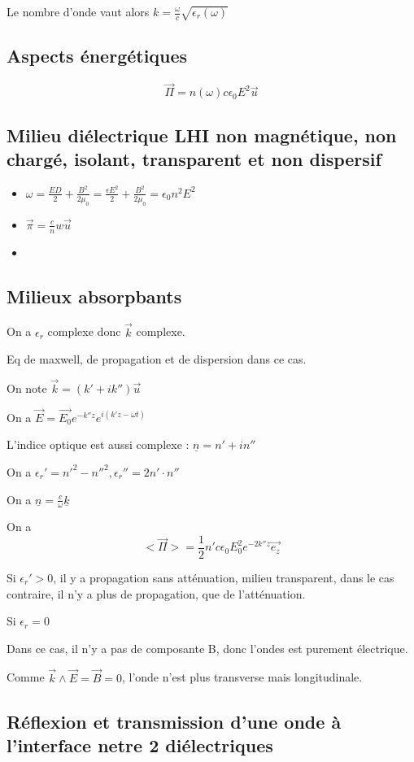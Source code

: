 \documentclass[french]{yLectureNote}
\renewcommand{\vec}{\overrightarrow}
\begin{document}
Le nombre d'onde vaut alors $ k = \frac{\omega}{c}\sqrt{\epsilon_r(\omega)}$
\subsection{Aspects énergétiques}
$$\vec{\Pi} = n(\omega)c\epsilon_0E^2\vec{u}$$
\subsection{Milieu diélectrique LHI non magnétique, non chargé, isolant, transparent et non dispersif}
\begin{itemize}
    \item $\omega = \frac{ED}{2}+\frac{B^2}{2\mu_0} = \frac{\epsilon E^2}{2}+\frac{B^2}{2\mu_0} = \epsilon_0n^2E^2$
    \item $\vec{\pi} = \frac{c}{n}w\vec{u}$
    \item %
\end{itemize}
\subsection{Milieux absorpbants}
On a $\epsilon_r$ complexe donc $\vec{k}$ complexe.

Eq de maxwell, de propagation et de dispersion dans ce cas.

On note $\vec{k} = (k'+ik'')\vec{u}$

On a $\vec{E} = \vec{E_0}e^{-k''z}e^{i(k'z-\omega t)}$


L'indice optique est aussi complexe : $\underline{n} = n'+in''$

On a $\epsilon_r' = n'^2-n''^2, \epsilon_r''=2n'\cdot n''$

On a $\underline{n} = \frac{c}{\omega}\underline{k}$

On a $$<\vec{\Pi}> = \frac12 n' c\epsilon_0E_0^2e^{-2k''z}\vec{e_z}$$

Si $\epsilon_r'>0$, il y a propagation sans atténuation, milieu transparent, dans le cas contraire, il n'y a plus de propagation, que de l'atténuation.

Si $\epsilon_r = 0$

Dans ce cas, il n'y a pas de composante B, donc l'ondes est purement électrique.

Comme $\vec{k}\wedge \vec{E} = \vec{B} = 0$, l'onde n'est plus transverse mais longitudinale.

\subsection{Réflexion et transmission d'une onde à l'interface netre 2 diélectriques}
\end{document}
